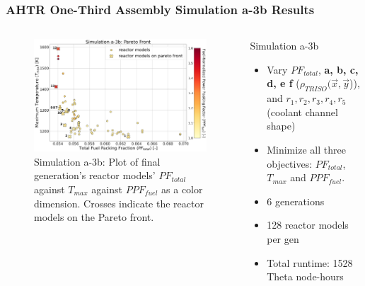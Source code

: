 \begin{frame}
    \frametitle{AHTR One-Third Assembly Simulation a-3b Results}
    \begin{columns}
    \begin{column}{0.7\textwidth}
    \begin{figure}
        \includegraphics[width=\linewidth]{../docs/figures/assem-obj-3-all-2d.png} 
        \caption{Simulation a-3b: Plot of final generation's reactor models' 
        $PF_{total}$ against $T_{max}$ against $PPF_{fuel}$ as a color dimension. 
        Crosses indicate the reactor models on the Pareto front.}
    \end{figure}
    \end{column}
    \begin{column}{0.35\textwidth}
        \begin{block}{Simulation a-3b}
            \begin{itemize}
            \item Vary $PF_{total}$, \textbf{a, b, c, d, e f} ($\rho_{TRISO}(\vec{x}, 
            \vec{y}$)), and $r_1, r_2, r_3, r_4, r_5$ (coolant channel shape) 
            \item Minimize all three objectives: $PF_{total}$, $T_{max}$ and $PPF_{fuel}$.
            \item 6 generations 
            \item 128 reactor models per gen 
            \item Total runtime: 1528 Theta node-hours 
            \end{itemize}
            \end{block}
        \end{column}
\end{columns}
\end{frame}

